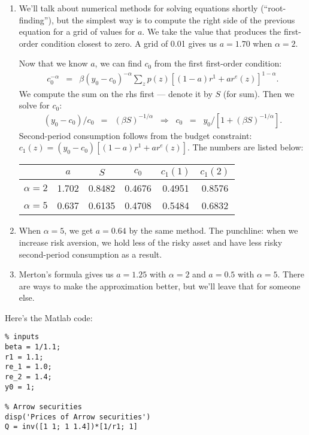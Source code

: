 \begin{enumerate}
\begin{enumerate}
\item
We'll talk about numerical methods for solving equations shortly (``root-finding''),
but the simplest way is to compute the right side of the previous equation
for a grid of values for $a$.
We take the value that produces the first-order condition closest to zero.
A grid of 0.01 gives us $a=1.70$ when $\alpha=2$.

Now that we know $a$, we can find $c_0$ from the first first-order condition:
\begin{eqnarray*}
    c_0^{-\alpha}  &=&  \beta (y_0-c_0)^{-\alpha}
            \sum_z p(z) [ (1-a)r^1 + a r^e(z)]^{1-\alpha}  .
\end{eqnarray*}
We compute the sum on the rhs first --- denote it by $S$ (for sum).
Then we solve for $c_0$:
\begin{eqnarray*}
    (y_0-c_0)/c_0 &=& (\beta S)^{-1/\alpha}
        \;\;\Rightarrow\;\;
        c_0  \;\;=\;\; y_0 /[ 1 + (\beta S)^{-1/\alpha}] .
\end{eqnarray*}
Second-period consumption follows from the budget constraint:
$c_1(z)=  (y_0-c_0)[(1-a) r^1 + a r^e(z)] $.
The numbers are listed below:
\begin{center}
\begin{tabular}{lccccc}
\toprule
                &  $a$  &  $S$    & $c_0$   &  $c_1(1)$ &  $c_1(2)$  \\
\midrule
$\alpha = 2$    & 1.702 & 0.8482  & 0.4676  & 0.4951    & 0.8576 \\
$\alpha = 5$    & 0.637 & 0.6135  & 0.4708  & 0.5484    & 0.6832 \\
\bottomrule
\end{tabular}
\end{center}

\item When $\alpha=5$, we get $a=0.64$ by the same method.
The punchline:  when we increase risk aversion, we hold less of the risky asset
and have less risky second-period consumption as a result.

\item Merton's formula gives us $a= 1.25$ with $\alpha = 2$
and $a = 0.5 $ with $\alpha = 5$.
There are ways to make the approximation better, but we'll leave that for someone else.
\end{enumerate}
%
Here's the Matlab code:
\begin{verbatim}
% inputs
beta = 1/1.1;
r1 = 1.1;
re_1 = 1.0;
re_2 = 1.4;
y0 = 1;

% Arrow securities
disp('Prices of Arrow securities')
Q = inv([1 1; 1 1.4])*[1/r1; 1]


\end{verbatim}
\end{enumerate}
